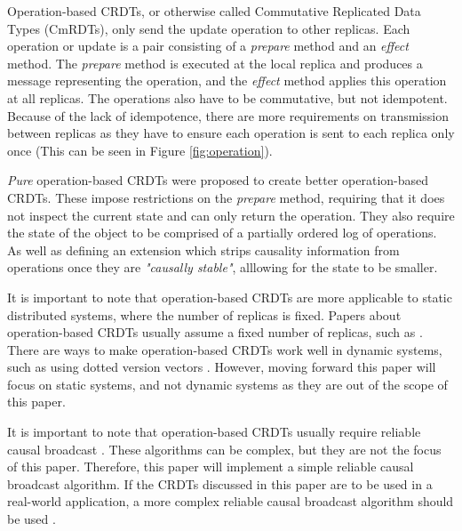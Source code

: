 \documentclass[12pt]{article}
\begin{document}
Operation-based CRDTs, or otherwise called Commutative Replicated Data Types (CmRDTs), only send the update operation to other replicas. Each operation or update is a pair consisting of a \textit{prepare} method and an \textit{effect} method. The \textit{prepare} method is executed at the local replica and produces a message representing the operation, and the \textit{effect} method applies this operation at all replicas\cite{10.1007/978-3-642-24550-3_29}. The operations also have to be commutative, but not idempotent. Because of the lack of idempotence, there are more requirements on transmission between replicas as they have to ensure each operation is sent to each replica only once (This can be seen in Figure \ref{fig:operation}). \par

\textit{Pure} operation-based CRDTs were proposed to create better operation-based CRDTs\cite{10.1007/978-3-662-43352-2_11}. These impose restrictions on the \textit{prepare} method, requiring that it does not inspect the current state and can only return the operation. They also require the state of the object to be comprised of a partially ordered log of operations. As well as defining an extension which strips causality information from operations once they are \textit{"causally stable"}\cite{10.1007/978-3-662-43352-2_11}, alllowing for the state to be smaller.

It is important to note that operation-based CRDTs are more applicable to static distributed systems, where the number of replicas is fixed. Papers about operation-based CRDTs usually assume a fixed number of replicas, such as \cite{baquero2017pure}. There are ways to make operation-based CRDTs work well in dynamic systems, such as using dotted version vectors \cite{preguiça2010dotted}. However, moving forward this paper will focus on static systems, and not dynamic systems as they are out of the scope of this paper.\par 

It is important to note that operation-based CRDTs usually require reliable causal broadcast \cite{10.1007/978-3-662-43352-2_11}. These algorithms can be complex, but they are not the focus of this paper. Therefore, this paper will implement a simple reliable causal broadcast algorithm. If the CRDTs discussed in this paper are to be used in a real-world application, a more complex reliable causal broadcast algorithm should be used \cite{10.1145/128738.128742}. \par
\end{document}
